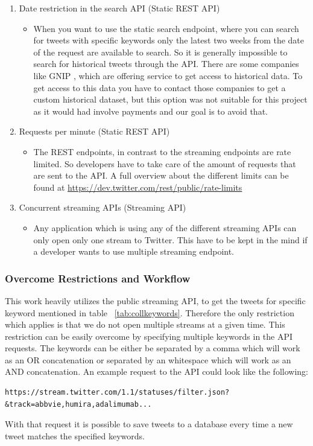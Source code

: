 \documentclass[11pt,titlepage,oneside,openany]{book}
\begin{document}
\begin{enumerate}
   \item Date restriction in the search API (Static REST API)
   \begin{itemize}
     \item When you want to use the static search endpoint, where you can search for tweets with specific keywords only the latest two weeks from the date of the request are available to search. So it is generally impossible to search for historical tweets through the API. There are some companies like GNIP \cite{GGnip2015-10-20}, which are offering service to get access to historical data. To get access to this data you have to contact those companies to get a custom historical dataset, but this option was not suitable for this project as it would had involve payments and our goal is to avoid that.
   \end{itemize}
   \item Requests per minute (Static REST API)
   \begin{itemize}
     \item The REST endpoints, in contrast to the streaming endpoints are rate limited. So developers have to take care of the amount of requests that are sent to the API. A full overview about the different limits can be found at \url{https://dev.twitter.com/rest/public/rate-limits} \cite{Twitter2016-11-22}
   \end{itemize}
   \item Concurrent streaming APIs (Streaming API)
   \begin{itemize}
     \item Any application which is using any of the different streaming APIs can only open only one stream to Twitter. This have to be kept in the mind if a developer wants to use multiple streaming endpoint. 
   \end{itemize}

\end{enumerate}





\subsubsection{Overcome Restrictions and Workflow}

This work heavily utilizes the public streaming API, to get the tweets for specific keyword mentioned in table ~\ref{tab:collkeywords}. Therefore the only restriction which applies is that we do not open multiple streams at a given time. This restriction can be easily overcome by specifying multiple keywords in the API requests. The keywords can be either be separated by a comma which will work as an OR concatenation or separated by an whitespace which will work as an AND concatenation. An example request to the API could look like the following:
\begin{lstlisting}
https://stream.twitter.com/1.1/statuses/filter.json?&track=abbvie,humira,adalimumab...
\end{lstlisting}
With that request it is possible to save tweets to a database every time a new tweet matches the specified keywords.
\end{document}
